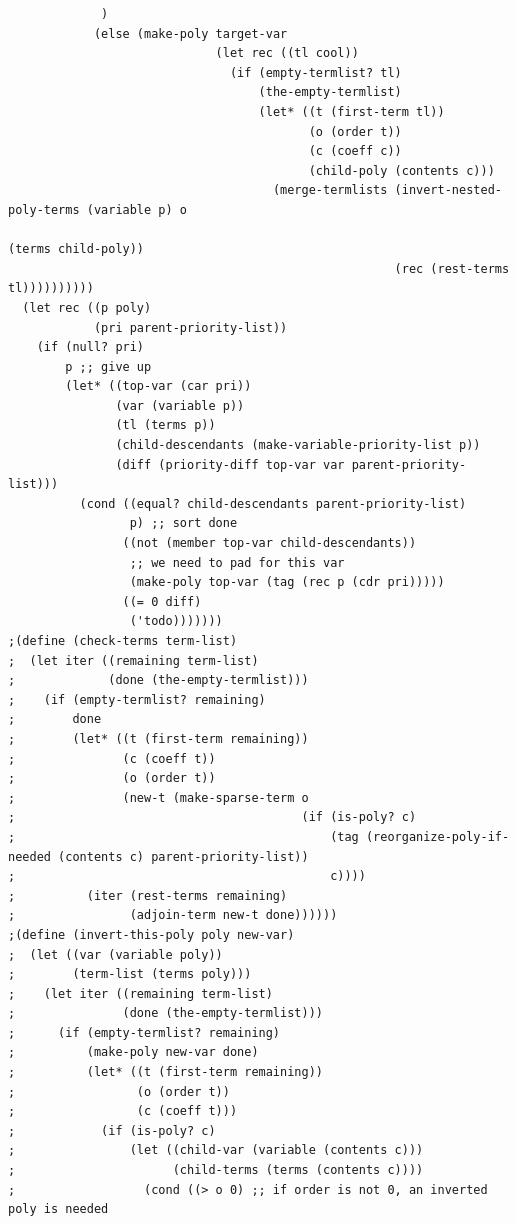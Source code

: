 \documentclass[final,fleqn,titlepage,twoside]{article}
\begin{document}
\begin{verbatim}
             )
            (else (make-poly target-var
                             (let rec ((tl cool))
                               (if (empty-termlist? tl)
                                   (the-empty-termlist)
                                   (let* ((t (first-term tl))
                                          (o (order t))
                                          (c (coeff c))
                                          (child-poly (contents c)))
                                     (merge-termlists (invert-nested-poly-terms (variable p) o
                                                                                (terms child-poly))
                                                      (rec (rest-terms tl))))))))))
  (let rec ((p poly)
            (pri parent-priority-list))
    (if (null? pri)
        p ;; give up
        (let* ((top-var (car pri))
               (var (variable p))
               (tl (terms p))
               (child-descendants (make-variable-priority-list p))
               (diff (priority-diff top-var var parent-priority-list)))
          (cond ((equal? child-descendants parent-priority-list)
                 p) ;; sort done
                ((not (member top-var child-descendants))
                 ;; we need to pad for this var
                 (make-poly top-var (tag (rec p (cdr pri)))))
                ((= 0 diff)
                 ('todo)))))))
;(define (check-terms term-list)
;  (let iter ((remaining term-list)
;             (done (the-empty-termlist)))
;    (if (empty-termlist? remaining)
;        done
;        (let* ((t (first-term remaining))
;               (c (coeff t))
;               (o (order t))
;               (new-t (make-sparse-term o
;                                        (if (is-poly? c)
;                                            (tag (reorganize-poly-if-needed (contents c) parent-priority-list))
;                                            c))))
;          (iter (rest-terms remaining)
;                (adjoin-term new-t done))))))
;(define (invert-this-poly poly new-var)
;  (let ((var (variable poly))
;        (term-list (terms poly)))
;    (let iter ((remaining term-list)
;               (done (the-empty-termlist)))
;      (if (empty-termlist? remaining)
;          (make-poly new-var done)
;          (let* ((t (first-term remaining))
;                 (o (order t))
;                 (c (coeff t)))
;            (if (is-poly? c)
;                (let ((child-var (variable (contents c)))
;                      (child-terms (terms (contents c))))
;                  (cond ((> o 0) ;; if order is not 0, an inverted poly is needed

\end{verbatim}
\end{document}
